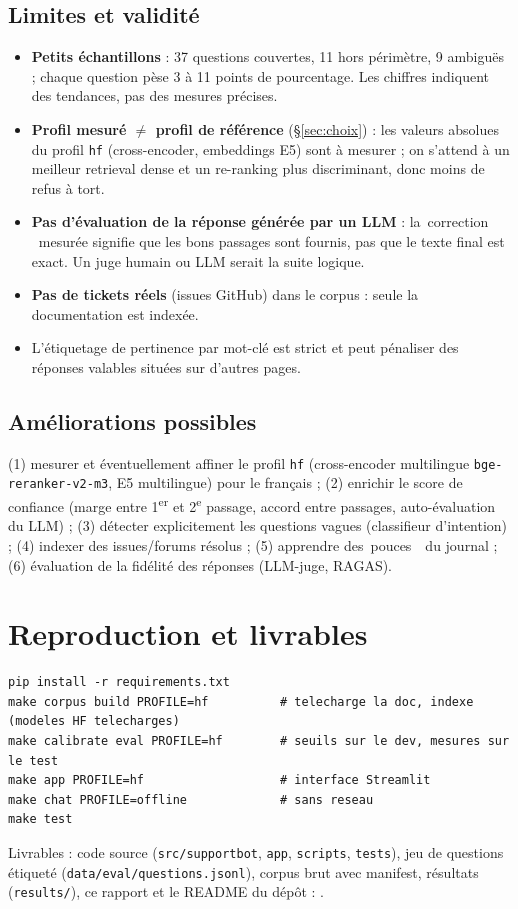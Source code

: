 \documentclass[11pt,a4paper]{article}
\providecommand{\og}{\guillemotleft\,}\providecommand{\fg}{\,\guillemotright}
\newcommand{\code}[1]{\texttt{\small #1}}
\begin{document}
\subsection{Limites et validit\'e}
\begin{itemize}[leftmargin=*,itemsep=1pt]
\item \textbf{Petits \'echantillons} : 37 questions couvertes, 11 hors p\'erim\`etre, 9 ambigu\"es ; chaque question pèse 3 \`a 11 points de pourcentage. Les chiffres indiquent des tendances, pas des mesures pr\'ecises.
\item \textbf{Profil mesur\'e $\neq$ profil de r\'ef\'erence} (\S\ref{sec:choix}) : les valeurs absolues du profil \code{hf} (cross-encoder, embeddings E5) sont \`a mesurer ; on s'attend \`a un meilleur retrieval dense et un re-ranking plus discriminant, donc moins de refus \`a tort.
\item \textbf{Pas d'\'evaluation de la r\'eponse g\'en\'er\'ee par un LLM} : la \og correction \fg\ mesur\'ee signifie que les bons passages sont fournis, pas que le texte final est exact. Un juge humain ou LLM serait la suite logique.
\item \textbf{Pas de tickets r\'eels} (issues GitHub) dans le corpus : seule la documentation est index\'ee.
\item L'\'etiquetage de pertinence par mot-cl\'e est strict et peut p\'enaliser des r\'eponses valables situ\'ees sur d'autres pages.
\end{itemize}
\subsection{Am\'eliorations possibles}
(1) mesurer et \'eventuellement affiner le profil \code{hf} (cross-encoder multilingue \code{bge-reranker-v2-m3}, E5 multilingue) pour le fran\c cais ; (2) enrichir le score de confiance (marge entre 1\textsuperscript{er} et 2\textsuperscript{e} passage, accord entre passages, auto-\'evaluation du LLM) ; (3) d\'etecter explicitement les questions vagues (classifieur d'intention) ; (4) indexer des issues/forums r\'esolus ; (5) apprendre des \og pouces \fg\ du journal ; (6) \'evaluation de la fid\'elit\'e des r\'eponses (LLM-juge, RAGAS).

\section{Reproduction et livrables}
\begin{lstlisting}
pip install -r requirements.txt
make corpus build PROFILE=hf          # telecharge la doc, indexe (modeles HF telecharges)
make calibrate eval PROFILE=hf        # seuils sur le dev, mesures sur le test
make app PROFILE=hf                   # interface Streamlit
make chat PROFILE=offline             # sans reseau
make test
\end{lstlisting}
Livrables : code source (\code{src/supportbot}, \code{app}, \code{scripts}, \code{tests}), jeu de questions \'etiquet\'e (\code{data/eval/questions.jsonl}), corpus brut avec manifest, r\'esultats (\code{results/}), ce rapport et le README du d\'epôt : \href{\RepoURL}{\texttt{\RepoURL}}.
\end{document}
